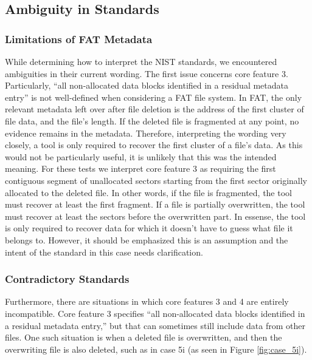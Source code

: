 \subsection{Ambiguity in Standards}

\subsubsection{Limitations of FAT Metadata}
While determining how to interpret the NIST standards, we encountered ambiguities in their current wording.
The first issue concerns core feature 3. 
Particularly, ``all non-allocated data blocks identified in a residual metadata entry''\cite{meta:dfr:standards} is not well-defined when considering a FAT file system. 
In FAT, the only relevant metadata left over after file deletion is the address of the first cluster of file data, and the file's length. 
If the deleted file is fragmented at any point, no evidence remains in the metadata. 
Therefore, interpreting the wording very closely, a tool is only required to recover the first cluster of a file's data. 
As this would not be particularly useful, it is unlikely that this was the intended meaning. 
For these tests we interpret core feature 3 as requiring the first contiguous segment of unallocated sectors starting from the first sector originally allocated to the deleted file. 
In other words, if the file is fragmented, the tool must recover at least the first fragment. 
If a file is partially overwritten, the tool must recover at least the sectors before the overwritten part.
In essense, the tool is only required to recover data for which it doesn't have to guess what file it belongs to.
However, it should be emphasized this is an assumption and the intent of the standard in this case needs clarification.

\subsubsection{Contradictory Standards}
Furthermore, there are situations in which core features 3 and 4 are entirely incompatible. 
Core feature 3 specifies ``all non-allocated data blocks identified in a residual metadata entry,''\cite{meta:dfr:standards} but that can sometimes still include data from other files. 
One such situation is when a deleted file is overwritten, and then the overwriting file is also deleted, such as in case 5i (as seen in Figure \ref{fig:case_5i}).


